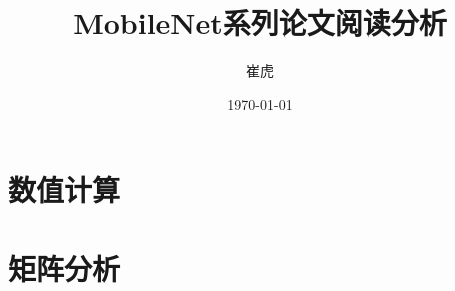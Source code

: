 \documentclass[a4paper,10pt]{article} %
\title{MobileNet系列论文阅读分析}
\date{\today}
\author{崔虎}
\begin{document}
\maketitle	
	
	
%	
	
	\tableofcontents
	
	
	
	\section{数值计算}
	
%	
%	
%	
%	
%	
%	
	
	\section{矩阵分析}
%	
	
	
	
\end{document}
